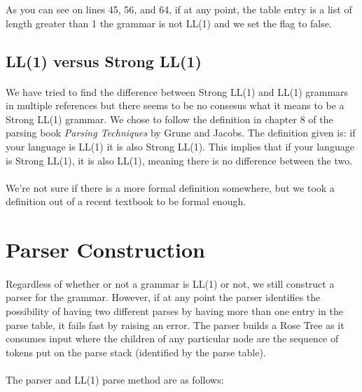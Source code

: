 \documentclass{article}
\begin{document}
As you can see on lines 45, 56, and 64, if at any point, the table
entry is a list of length greater than 1 the grammar is not LL(1) and
we set the flag to false.

\subsection{LL(1) versus Strong LL(1)}
\paragraph{}We have tried to find the difference between Strong LL(1)
and LL(1) grammars in multiple references but there seems to be no
consesus what it means to be a Strong LL(1) grammar. We chose to
follow the definition in chapter 8 of the parsing book \emph{Parsing
  Techniques} by Grune and Jacobs. The definition given is: if your
language is LL(1) it is also Strong LL(1). This implies that if your
language is Strong LL(1), it is also LL(1), meaning there is no
difference between the two.

\paragraph{}We're not sure if there is a more formal definition
 somewhere, but we took a definition out of a recent textbook to be
 formal enough.

\section{Parser Construction}
\label{sec:parser}
\paragraph{}Regardless of whether or not a grammar is LL(1) or not,
we still construct a parser for the grammar. However, if at any point
the parser identifies the possibility of having two different parses
by having more than one entry in the parse table, it fails fast by
raising an error. The parser builds a Rose Tree as it consumes input
where the children of any particular node are the sequence of tokens
put on the parse stack (identified by the parse table).

\paragraph{}The parser and LL(1) parse method are as follows:
\end{document}
